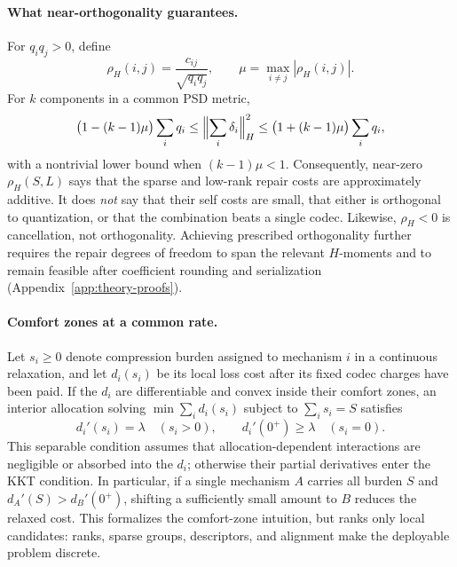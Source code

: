 \paragraph{What near-orthogonality guarantees.}
For $q_iq_j>0$, define
\begin{equation}
\rho_H(i,j)=\frac{c_{ij}}{\sqrt{q_iq_j}},\qquad
\mu=\max_{i\ne j}|\rho_H(i,j)|.
\end{equation}
For $k$ components in a common PSD metric,
\begin{equation}
\label{eq:coherence-bound}
\bigl(1-(k-1)\mu\bigr)\sum_iq_i
\le \Bigl\|\sum_i\delta_i\Bigr\|_H^2
\le \bigl(1+(k-1)\mu\bigr)\sum_iq_i,
\end{equation}
with a nontrivial lower bound when $(k-1)\mu<1$.
Consequently, near-zero $\rho_H(S,L)$ says that the sparse and low-rank
repair costs are approximately additive.  It does \emph{not} say that
their self costs are small, that either is orthogonal to quantization,
or that the combination beats a single codec.  Likewise,
$\rho_H<0$ is cancellation, not orthogonality.  Achieving prescribed
orthogonality further requires the repair degrees of freedom to span
the relevant $H$-moments and to remain feasible after coefficient
rounding and serialization (Appendix~\ref{app:theory-proofs}).

\paragraph{Comfort zones at a common rate.}
Let $s_i\ge0$ denote compression burden assigned to mechanism $i$ in a
continuous relaxation, and let $d_i(s_i)$ be its local loss cost after
its fixed codec charges have been paid.  If the $d_i$ are differentiable
and convex inside their comfort zones, an interior allocation solving
$\min\sum_i d_i(s_i)$ subject to $\sum_i s_i=S$ satisfies
\begin{equation}
\label{eq:kkt-comfort}
d_i'(s_i)=\lambda\quad(s_i>0),
\qquad d_i'(0^+)\ge\lambda\quad(s_i=0).
\end{equation}
This separable condition assumes that allocation-dependent interactions
are negligible or absorbed into the $d_i$; otherwise their partial
derivatives enter the KKT condition.
In particular, if a single mechanism $A$ carries all burden $S$ and
$d_A'(S)>d_B'(0^+)$, shifting a sufficiently small amount to $B$
reduces the relaxed cost.  This formalizes the comfort-zone intuition,
but ranks only local candidates: ranks, sparse groups, descriptors, and
alignment make the deployable problem discrete.

